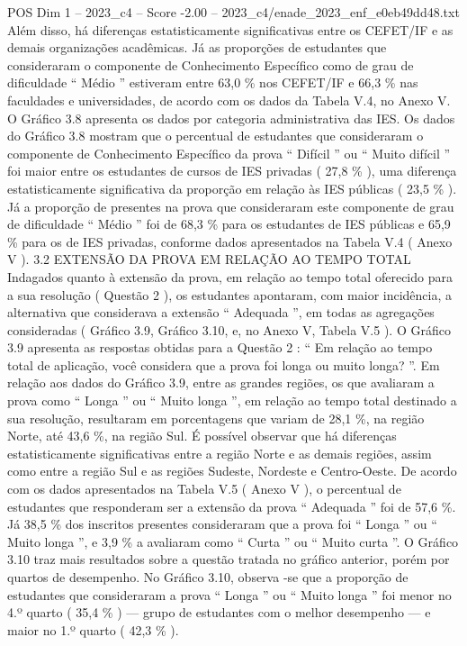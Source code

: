 \begin{textsample}{POS Dim 1 – 2023\_c4 – Score -2.00 – 2023\_c4/enade\_2023\_enf\_e0eb49dd48.txt}
Além disso, há diferenças estatisticamente significativas entre os CEFET/IF e as demais organizações acadêmicas.
Já as proporções de estudantes que consideraram o componente de Conhecimento Específico como de grau de dificuldade “ Médio ” estiveram entre 63,0 \% nos CEFET/IF e 66,3 \% nas faculdades e universidades, de acordo com os dados da Tabela V.4, no Anexo V.
O Gráfico 3.8 apresenta os dados por categoria administrativa das IES.
Os dados do Gráfico 3.8 mostram que o percentual de estudantes que consideraram o componente de Conhecimento Específico da prova “ Difícil ” ou “ Muito difícil ” foi maior entre os estudantes de cursos de IES privadas ( 27,8 \% ), uma diferença estatisticamente significativa da proporção em relação às IES públicas ( 23,5 \% ).
Já a proporção de presentes na prova que consideraram este componente de grau de dificuldade “ Médio ” foi de 68,3 \% para os estudantes de IES públicas e 65,9 \% para os de IES privadas, conforme dados apresentados na Tabela V.4 ( Anexo V ). 3.2 EXTENSÃO DA PROVA EM RELAÇÃO AO TEMPO TOTAL Indagados quanto à extensão da prova, em relação ao tempo total oferecido para a sua resolução ( Questão 2 ), os estudantes apontaram, com maior incidência, a alternativa que considerava a extensão “ Adequada ”, em todas as agregações consideradas ( Gráfico 3.9, Gráfico 3.10, e, no Anexo V, Tabela V.5 ).
O Gráfico 3.9 apresenta as respostas obtidas para a Questão 2 : “ Em relação ao tempo total de aplicação, você considera que a prova foi longa ou muito longa? ”.
Em relação aos dados do Gráfico 3.9, entre as grandes regiões, os que avaliaram a prova como “ Longa ” ou “ Muito longa ”, em relação ao tempo total destinado a sua resolução, resultaram em porcentagens que variam de 28,1 \%, na região Norte, até 43,6 \%, na região Sul.
É possível observar que há diferenças estatisticamente significativas entre a região Norte e as demais regiões, assim como entre a região Sul e as regiões Sudeste, Nordeste e Centro-Oeste.
De acordo com os dados apresentados na Tabela V.5 ( Anexo V ), o percentual de estudantes que responderam ser a extensão da prova “ Adequada ” foi de 57,6 \%.
Já 38,5 \% dos inscritos presentes consideraram que a prova foi “ Longa ” ou “ Muito longa ”, e 3,9 \% a avaliaram como “ Curta ” ou “ Muito curta ”.
O Gráfico 3.10 traz mais resultados sobre a questão tratada no gráfico anterior, porém por quartos de desempenho.
No Gráfico 3.10, observa -se que a proporção de estudantes que consideraram a prova “ Longa ” ou “ Muito longa ” foi menor no 4.º quarto ( 35,4 \% ) — grupo de estudantes com o melhor desempenho — e maior no 1.º quarto ( 42,3 \% ).

\end{textsample}
